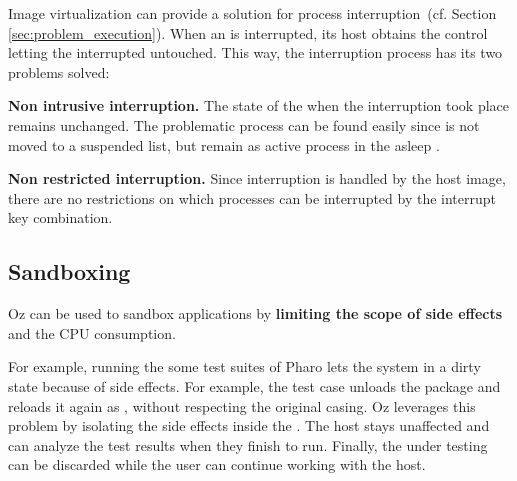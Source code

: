 Image virtualization can provide a solution for process interruption~(cf. Section \ref{sec:problem_execution}). When an \objectspace is interrupted, its host obtains the control letting the interrupted \objectspace untouched. This way, the interruption process has its two problems solved:
\begin{description}
	\item \textbf{Non intrusive interruption.} The state of the \objectspace when the interruption took place remains unchanged. The problematic process can be found easily since is not moved to a suspended list, but remain as active process in the asleep \objectspace.
	\item \textbf{Non restricted interruption.} Since interruption is handled by the host image, there are no restrictions on which processes can be interrupted by the interrupt key combination.
\end{description}
 
\subsection{Sandboxing}
 
Oz can be used to sandbox applications by \textbf{limiting the scope of side effects} and the CPU consumption. 

For example, running the some test suites of Pharo lets the system in a dirty state because of side effects. For example, the test case  unloads the  package and reloads it again as , without respecting the original casing. Oz leverages this problem by isolating the side effects inside the \objectspace. The host stays unaffected and can analyze the test results when they finish to run. Finally, the \objectspace under testing can be discarded while the user can continue working with the host.



